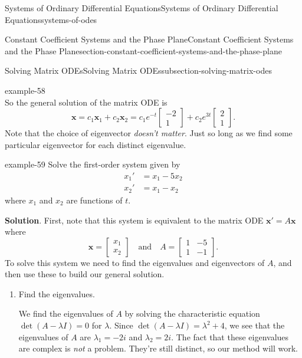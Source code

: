 \documentclass[oneside,10pt,]{book}
\numberwithin{equation}{section}
\renewcommand{\vec}[1]{\mathbf{#1}}
\newcommand{\qq}[1]{\quad\text{#1}\quad}
\newcommand{\amp}{&}
\begin{document}
\begin{chapterptx}{Systems of Ordinary Differential Equations}{}{Systems of Ordinary Differential Equations}{}{}{systems-of-odes}
\begin{sectionptx}{Constant Coefficient Systems and the Phase Plane}{}{Constant Coefficient Systems and the Phase Plane}{}{}{section-constant-coefficient-systems-and-the-phase-plane}
\begin{subsectionptx}{Solving Matrix ODEs}{}{Solving Matrix ODEs}{}{}{subsection-solving-matrix-odes}
\begin{example}{}{example-58}
\begin{equation*}
\end{equation*}
So the general solution of the matrix ODE is%
\begin{equation*}
\vec{x} = c_{1}\vec{x}_{1} + c_{2}\vec{x}_{2} = c_{1}e^{-t}\begin{bmatrix}-2\\1\end{bmatrix} + c_{2}e^{3t}\begin{bmatrix}2\\1\end{bmatrix}.
\end{equation*}
Note that the choice of eigenvector \emph{doesn't matter}. Just so long as we find some particular eigenvector for each distinct eigenvalue.%
\end{example}
\begin{example}{}{example-59}%
\hypertarget{p-347}{}%
Solve the first-order system given by%
\begin{align*}
x_{1}' \amp = x_{1} - 5x_{2}\\
x_{2}' \amp = x_{1} - x_{2}
\end{align*}
where \(x_{1}\) and \(x_{2}\) are functions of \(t\).%
\par\smallskip%
\noindent\textbf{Solution}.\hypertarget{solution-56}{}\quad%
\hypertarget{p-348}{}%
First, note that this system is equivalent to the matrix ODE \(\vec{x}' = A\vec{x}\) where%
\begin{equation*}
\vec{x} = \begin{bmatrix}x_{1} \\ x_{2}\end{bmatrix}\qq{and} A = \begin{bmatrix}1 \amp  -5 \\ 1 \amp  -1\end{bmatrix}.
\end{equation*}
To solve this system we need to find the eigenvalues and eigenvectors of \(A\), and then use these to build our general solution.\leavevmode%
\begin{enumerate}
\item\hypertarget{li-20}{}\hypertarget{p-349}{}%
Find the eigenvalues.%
\par
\hypertarget{p-350}{}%
We find the eigenvalues of \(A\) by solving the characteristic equation \(\det(A - \lambda I) = 0\) for \(\lambda\). Since \(\det(A - \lambda I) = \lambda^{2}+4\), we see that the eigenvalues of \(A\) are \(\lambda_{1} = -2i\) and \(\lambda_{2} = 2i\). The fact that these eigenvalues are complex is \emph{not} a problem. They're still distinct, so our method will work.%

\end{enumerate}
\end{example}
\end{subsectionptx}
\end{sectionptx}
\end{chapterptx}
\end{document}
